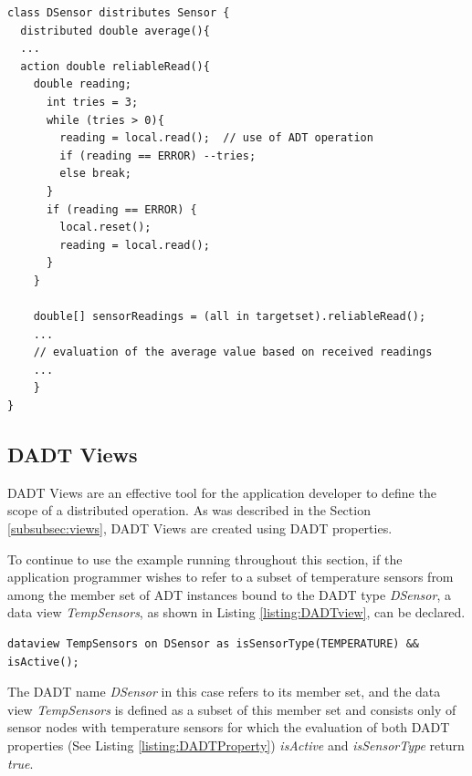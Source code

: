 \begin{lstlisting}[frame=trbl, basewidth={0.55em, 0.6em}, captionpos=b, 
basicstyle=\ttfamily\footnotesize, breaklines, caption = Use of DADT Action (reproduced from \cite{migliavacca_DADT:2006}), label = listing:DADTAction]  
class DSensor distributes Sensor {
  distributed double average(){
  ...  
  action double reliableRead(){
    double reading;
      int tries = 3;
      while (tries > 0){
        reading = local.read();  // use of ADT operation
        if (reading == ERROR) --tries;
        else break; 
      }
      if (reading == ERROR) {
        local.reset();
        reading = local.read();
      }
    }

    double[] sensorReadings = (all in targetset).reliableRead();
    ...
    // evaluation of the average value based on received readings	
    ...
    }
}
\end{lstlisting}

\subsection{DADT Views} \label{subsubsec:viewsImpl}

DADT Views are an effective tool for the application developer to
define the scope of a distributed operation. As was described in the Section
\ref{subsubsec:views}, DADT Views are created using DADT properties.

To continue to use the example running throughout this section, if the application programmer wishes to refer to a subset of temperature sensors from among the member set of ADT instances bound to the DADT type \emph{DSensor}, a data view \emph{TempSensors}, 
as shown in Listing \ref{listing:DADTview}, can be declared.
  
\begin{lstlisting}[frame=trbl, basewidth={0.55em, 0.6em}, captionpos=b, 
basicstyle=\ttfamily\footnotesize, breaklines, caption = Definition of DADT Data View, label = listing:DADTview ]  
dataview TempSensors on DSensor as isSensorType(TEMPERATURE) && isActive(); 
\end{lstlisting}

The DADT name \emph{DSensor} in this case refers to its member set, and 
the data view \emph{TempSensors} is defined as a subset of this member set and
consists only of sensor nodes with temperature sensors for which the evaluation of
both DADT properties (See Listing \ref{listing:DADTProperty}) \emph{isActive}
and \emph{isSensorType} return \emph{true}. 

